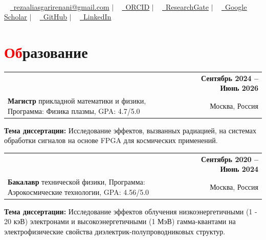 \documentclass[a4paper, 10pt]{article} %
\makeatletter
\newcommand{\resumeItem}[1]{
    \item\small{
        {#1 \vspace{-2pt}}
    }
}
\newcommand{\resumeSubheading}[4]{
    \vspace{-2pt}\item
    \begin{tabular*}{1.0\textwidth}[t]{l@{\extracolsep{\fill}}r}
        \textbf{#1} & \textbf{\small #2} \\
        \small#3 & \small #4
    \end{tabular*}\vspace{-7pt}
}
\newcommand{\resumeSubHeadingListStart}{\begin{itemize}[leftmargin=0.0in, label={}]}
\newcommand{\resumeSubHeadingListEnd}{\end{itemize}}
\makeatother
\begin{document}
\begin{center}
    {\Huge \scshape {\fontsize{25}{30}\selectfont{Реза}} {\fontsize{25}{30}}} \\ \vspace{3pt}
    \small ~ 
    \href{mailto:rezaaliasgarirenani@gmail.com}{\raisebox{-0.2\height}\faEnvelope\ \underline{rezaaliasgarirenani@gmail.com}} $|$ ~
    \href{https://orcid.org/0009-0000-8983-755X}{\raisebox{-0.2\height}\faOrcid\ \underline{ORCID}} $|$ ~
    \href{https://www.researchgate.net/profile/Reza-Aliasgari-Renani}{\raisebox{-0.2\height}\faResearchgate\
    \underline{ResearchGate}} $|$ ~
    \href{https://scholar.google.com/citations?user=L9Vv3C8AAAAJ&hl=en}{\raisebox{-0.2\height}\faGraduationCap\ \underline{Google Scholar}} $|$ ~
    \href{https://github.com/rezaaliasgarirenani}{\raisebox{-0.2\height}\faGithub\ \underline{GitHub}} $|$ ~
    \href{https://linkedin.com/in/reza-aliasgari-renani}{\raisebox{-0.2\height}\faLinkedin\ \underline{LinkedIn}}
    \vspace{-10pt}
\end{center}

\section{\textcolor{red}{Об}разование}
\resumeSubHeadingListStart
    \resumeSubheading
        {\href{https://mipt.ru/}{\parbox[t]{\dimexpr\linewidth-6cm}{Московский физико-технический институт (МФТИ, Физтех)}}}{Сентябрь 2024 -- Июнь 2026}
        {\textbf{Магистр} прикладной математики и физики, Программа: Физика плазмы, GPA: 4.7/5.0}{Москва, Россия}
        {\resumeItem{\textbf{Тема диссертации:} Исследование эффектов, вызванных радиацией, на системах обработки сигналов на основе FPGA для космических применений.}}
    \resumeSubheading
        {\href{https://mipt.ru/}{\parbox[t]{\dimexpr\linewidth-6cm}{Московский физико-технический институт (МФТИ, Физтех)}}}{Сентябрь 2020 -- Июнь 2024}
        {\textbf{Бакалавр} технической физики, Программа: Аэрокосмические технологии, GPA: 4.56/5.0}{Москва, Россия}
        {\resumeItem{\textbf{Тема диссертации:} Исследование эффектов облучения низкоэнергетичными (1 - 20 кэВ) электронами и высокоэнергетичными (1 МэВ) гамма-квантами на электрофизические свойства диэлектрик-полупроводниковых структур.}}
\resumeSubHeadingListEnd
\vspace{-18pt} %
\end{document}
